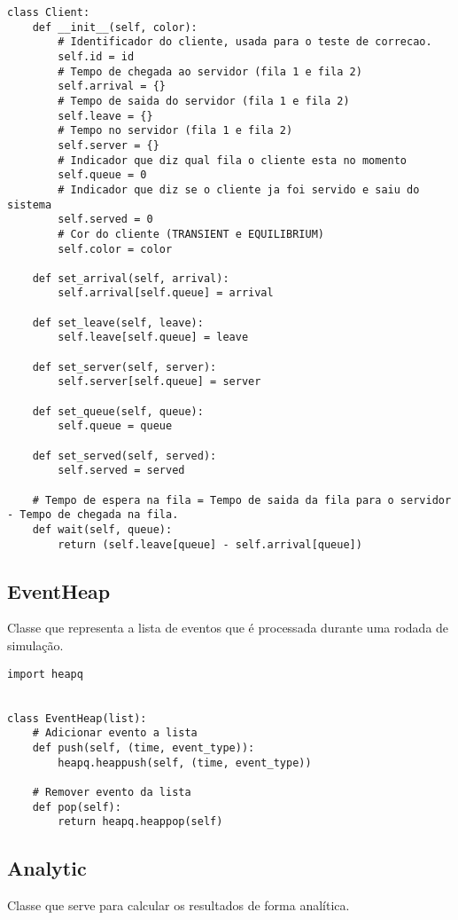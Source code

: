 \begin{lstlisting}
class Client:
    def __init__(self, color):
        # Identificador do cliente, usada para o teste de correcao.
        self.id = id    
        # Tempo de chegada ao servidor (fila 1 e fila 2)
        self.arrival = {}
        # Tempo de saida do servidor (fila 1 e fila 2)
        self.leave = {}
        # Tempo no servidor (fila 1 e fila 2)
        self.server = {}
        # Indicador que diz qual fila o cliente esta no momento
        self.queue = 0
        # Indicador que diz se o cliente ja foi servido e saiu do sistema
        self.served = 0
        # Cor do cliente (TRANSIENT e EQUILIBRIUM)
        self.color = color

    def set_arrival(self, arrival):
        self.arrival[self.queue] = arrival

    def set_leave(self, leave):
        self.leave[self.queue] = leave

    def set_server(self, server):
        self.server[self.queue] = server

    def set_queue(self, queue):
        self.queue = queue
        
    def set_served(self, served):
        self.served = served

    # Tempo de espera na fila = Tempo de saida da fila para o servidor - Tempo de chegada na fila.
    def wait(self, queue):
        return (self.leave[queue] - self.arrival[queue])
\end{lstlisting}

\subsection{EventHeap}
Classe que representa a lista de eventos que é processada durante uma rodada de simulação.\\

\begin{lstlisting}
import heapq


class EventHeap(list):
    # Adicionar evento a lista
    def push(self, (time, event_type)):
        heapq.heappush(self, (time, event_type))

    # Remover evento da lista
    def pop(self):
        return heapq.heappop(self)
\end{lstlisting}

\subsection{Analytic}
Classe que serve para calcular os resultados de forma analítica.\\


